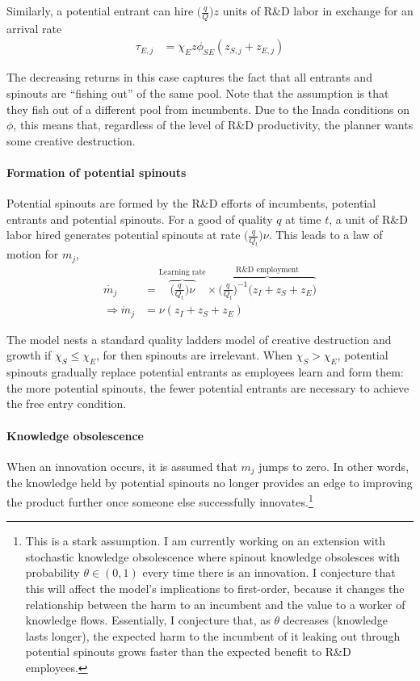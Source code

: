 \documentclass[12pt,english]{article}
\theoremstyle{remark}
\begin{document}
Similarly, a potential entrant can hire $\Big( \frac{q}{Q}\Big) z$ units of R\&D labor in exchange for an arrival rate 
\begin{align}
\tau_{E,j} &= \chi_E z \phi_{SE} (z_{S,j} + z_{E,j})  
\end{align}

The decreasing returns in this case captures the fact that all entrants and spinouts are ``fishing out'' of the same pool. Note that the assumption is that they fish out of a different pool from incumbents. Due to the Inada conditions on $\phi$, this means that, regardless of the level of R\&D productivity, the planner wants some creative destruction. 

\paragraph{Formation of potential spinouts}

Potential spinouts are formed by the R\&D efforts of incumbents, potential entrants and potential spinouts. For a good of quality $q$ at time $t$, a unit of R\&D labor hired generates potential spinouts at rate $\Big( \frac{q}{Q_t}\Big) \nu$. This leads to a law of motion for $m_j$,
\begin{align}
	\dot{m_j} &= \overbrace{\Big( \frac{q}{Q_t}\Big) \nu}^{\textrm{Learning rate}}\times \overbrace{\Big( \frac{q}{Q_t}\Big)^{-1} \Big( z_I + z_S + z_E \Big)}^{\textrm{R\&D  employment}} \nonumber \\
	       \Rightarrow \dot{m}_j &= \nu (z_I + z_S + z_E) \label{mj_law_of_motion}
\end{align}

The model nests a standard quality ladders model of creative destruction and growth if $\chi_S \le \chi_E$, for then spinouts are irrelevant. When $\chi_S > \chi_E$, potential spinouts gradually replace potential entrants as employees learn and form them: the more potential spinouts, the fewer potential entrants are necessary to achieve the free entry condition.

\paragraph{Knowledge obsolescence}

When an innovation occurs, it is assumed that $m_j$ jumps to zero. In other words, the knowledge held by potential spinouts no longer provides an edge to improving the product further once someone else successfully innovates.\footnote{This is a stark assumption. I am currently working on an extension with stochastic knowledge obsolescence where spinout knowledge obsolesces with probability $\theta \in (0,1)$ every time there is an innovation. I conjecture that this will affect the model's implications to first-order, because it changes the relationship between the harm to an incumbent and the value to a worker of knowledge flows. Essentially, I conjecture that, as $\theta$ decreases (knowledge lasts longer), the expected harm to the incumbent of it leaking out through potential spinouts grows faster than the expected benefit to R\&D employees.}
\end{document}
